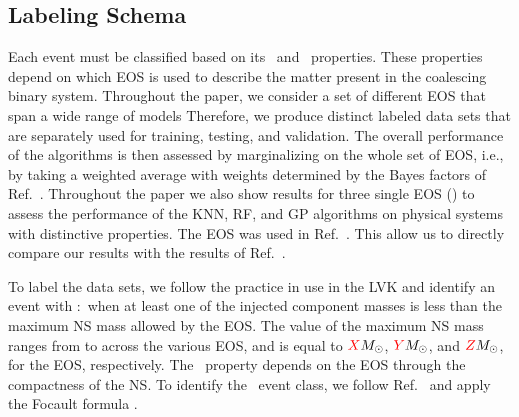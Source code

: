 \subsection*{Labeling Schema}

Each event must be classified based on its \hasns\ and \hasrem\ properties. These properties depend on which \ac{EOS} is used to describe the matter present in the coalescing binary
system. Throughout the paper, we consider a set of  different \ac{EOS} that span a wide range of models  Therefore, we
produce  distinct labeled data sets that are separately used for training, testing, and validation. The overall performance of the algorithms is then assessed by marginalizing on the whole set of \ac{EOS}, i.e., by taking a weighted average with weights determined by the Bayes factors of Ref.~. Throughout the paper we also show results for three single \ac{EOS} () to assess the performance of the \ac{KNN}, \ac{RF}, and \ac{GP} algorithms on physical systems with distinctive properties. The  \ac{EOS} was used in Ref.~. This allow us to directly compare our results with the results of Ref.~.

To label the data sets, we follow the practice in use in the \ac{LVK} and identify an event with \hasns:\true\ when at least one of the injected component masses is less than the
maximum \ac{NS} mass allowed by the \ac{EOS}. The value of the maximum \ac{NS} mass ranges from  to  across the various \ac{EOS}, and is equal to
$\textcolor{red}{X}M_\odot$, $\textcolor{red}{Y}M_\odot$, and $\textcolor{red}{Z}M_\odot$, for the  \ac{EOS}, respectively. The \hasrem\ property depends on the \ac{EOS} through the
compactness of the \ac{NS}. To identify the \hasrem\ event class, we follow Ref.\ \cite{Chatterjee:2019avs} and apply the Focault formula .
